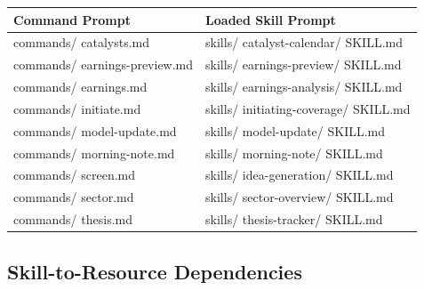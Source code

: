 \documentclass[11pt]{article}
\begin{document}
\begingroup
\small
\setlength{\tabcolsep}{2pt}
\begin{longtable}{>{\RaggedRight\arraybackslash\hspace{0pt}}p{}>{\RaggedRight\arraybackslash\hspace{0pt}}p{}}
\toprule
{} \textbf{Command Prompt} & \textbf{Loaded Skill Prompt} \\
\midrule
{} commands/ catalysts.md & skills/ catalyst-calendar/ SKILL.md \\
{} commands/ earnings-preview.md & skills/ earnings-preview/ SKILL.md \\
{} commands/ earnings.md & skills/ earnings-analysis/ SKILL.md \\
{} commands/ initiate.md & skills/ initiating-coverage/ SKILL.md \\
{} commands/ model-update.md & skills/ model-update/ SKILL.md \\
{} commands/ morning-note.md & skills/ morning-note/ SKILL.md \\
{} commands/ screen.md & skills/ idea-generation/ SKILL.md \\
{} commands/ sector.md & skills/ sector-overview/ SKILL.md \\
{} commands/ thesis.md & skills/ thesis-tracker/ SKILL.md \\
\bottomrule
\end{longtable}
\endgroup

\subsection{Skill-to-Resource Dependencies}
\end{document}
